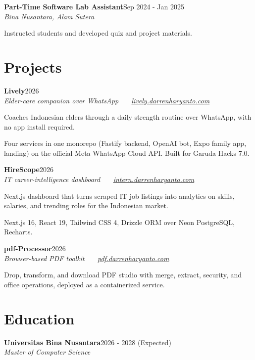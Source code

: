 \documentclass[a4paper,11pt]{article}
\newcommand{\entry}[4]{%
  \textbf{#1}\hfill{\color{muted}#2}\\[0.15em]
  {\color{muted}\textit{#3}}\hfill{\color{muted}#4}\par\vspace{0.15em}%
}
\begin{document}
\entry{Part-Time Software Lab Assistant}{Sep 2024 - Jan 2025}{Bina Nusantara, Alam Sutera}{}
\begin{tight}
  \item Instructed students and developed quiz and project materials.
\end{tight}

\section{Projects}
\entry{Lively}{2026}{Elder-care companion over WhatsApp \ \textbullet\ \ \href{https://lively.darrenharyanto.com}{lively.darrenharyanto.com}}{}
\begin{tight}
  \item Coaches Indonesian elders through a daily strength routine over WhatsApp, with no app install required.
  \item Four services in one monorepo (Fastify backend, OpenAI bot, Expo family app, landing) on the official Meta WhatsApp Cloud API. Built for Garuda Hacks 7.0.
\end{tight}
\vspace{0.4em}

\entry{HireScope}{2026}{IT career-intelligence dashboard \ \textbullet\ \ \href{https://intern.darrenharyanto.com}{intern.darrenharyanto.com}}{}
\begin{tight}
  \item Next.js dashboard that turns scraped IT job listings into analytics on skills, salaries, and trending roles for the Indonesian market.
  \item Next.js 16, React 19, Tailwind CSS 4, Drizzle ORM over Neon PostgreSQL, Recharts.
\end{tight}
\vspace{0.4em}

\entry{pdf-Processor}{2026}{Browser-based PDF toolkit \ \textbullet\ \ \href{https://pdf.darrenharyanto.com}{pdf.darrenharyanto.com}}{}
\begin{tight}
  \item Drop, transform, and download PDF studio with merge, extract, security, and office operations, deployed as a containerized service.
\end{tight}

\newpage %
\section{Education}
\entry{Universitas Bina Nusantara}{2026 - 2028 (Expected)}{Master of Computer Science}{}
\vspace{0.4em}
\end{document}

